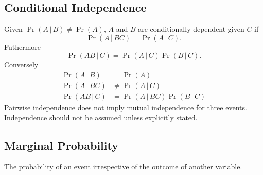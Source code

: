\documentclass{article}
\begin{document}
\begin{multicols}{3}
    \subsection{Conditional Independence}
    Given \(\Pr{\left( A \,\vert\, B \right)} \neq \Pr{\left( A \right)}\),
    \(A\) and \(B\) are conditionally dependent given \(C\) if
    \begin{equation*}
        \Pr{\left( A \,\vert\, BC \right)} = \Pr{\left( A \,\vert\, C \right)}.
    \end{equation*}
    Futhermore
    \begin{equation*}
        \Pr{\left( AB \,\vert\, C \right)} = \Pr{\left( A \,\vert\, C \right)} \Pr{\left( B \,\vert\, C \right)}.
    \end{equation*}
    Conversely
    \begin{align*}
        \Pr{\left( A \,\vert\, B \right)}  & = \Pr{\left( A \right)}                                                \\
        \Pr{\left( A \,\vert\, BC \right)} & \neq \Pr{\left( A \,\vert\, C \right)}                                 \\
        \Pr{\left( AB \,\vert\, C \right)} & = \Pr{\left( A \,\vert\, BC \right)} \Pr{\left( B \,\vert\, C \right)}
    \end{align*}
    Pairwise independence does not imply mutual independence for three events.
    Independence should not be assumed unless explicitly stated.
    \subsection{Marginal Probability}
    The probability of an event irrespective of the outcome of another variable.

\end{multicols}
\end{document}
